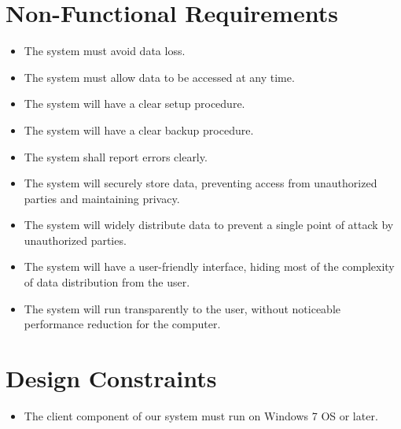 \section {Non-Functional Requirements}
	\begin{itemize}
		\item The system must avoid data loss.

		\item The system must allow data to be accessed at any time.

		\item The system will have a clear setup procedure.
		
		\item The system will have a clear backup procedure.
		
		\item The system shall report errors clearly.

		\item The system will securely store data, preventing access from unauthorized parties and maintaining privacy.

		\item The system will widely distribute data to prevent a single point of attack by unauthorized parties.

		\item The system will have a user-friendly interface, hiding most of the complexity of data distribution from the user.

		\item The system will run transparently to the user, without noticeable performance reduction for the computer.
	\end{itemize}

\section {Design Constraints}
	\begin{itemize}
		\item The client component of our system must run on Windows 7 OS or later.

		
	\end{itemize}